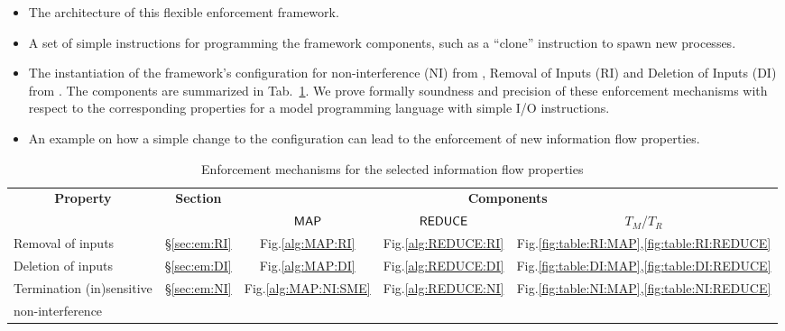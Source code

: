 \documentclass[10pt,a4paper,oneside]{article}
\def\TAV{\ensuremath{T_{M}}}
\def\TPV{\ensuremath{T_{R}}}
\def\sanserif#1{\ensuremath{\sf #1}}
\def\REDUCE{\ensuremath{\sanserif{REDUCE}}}
\def\MAP{\ensuremath{\sanserif{MAP}}}
\def\NCLONE{clone}
\begin{document}
\begin{itemize}
\item The architecture of this flexible enforcement framework.

\item A set of simple instructions for programming the framework components, such as a ``\NCLONE'' instruction to spawn new processes.

\item The instantiation of the framework's configuration for non-interference (NI) from \cite{Devr-Pies-10-IEEESP}, Removal of Inputs (RI) and Deletion of Inputs (DI) from \cite{MANT-00-CSF}. The components are summarized in Tab.~\ref{tab:component:ifp}. We prove formally soundness and precision of these enforcement mechanisms with respect to the corresponding properties for a model programming language with simple I/O instructions.
\item An example on how a simple change to the configuration can lead to the enforcement of new information flow properties.
\end{itemize}


\begin{table}
\centering
\caption{Enforcement mechanisms for the selected information flow properties}
\label{tab:component:ifp}
\begin{tabular}{|p{4.1cm}|c|c|c|c|}
\hline
\multicolumn{1}{|c|}{\multirow{2}{*}{\textbf{Property}}} & \multirow{2}{*}{\textbf{Section}} & \multicolumn{3}{c|}{\textbf{Components}}\\
\cline{3-5}
 & & \MAP& \REDUCE& \TAV/\TPV \\
\hline
\hline
Removal of inputs \cite{MANT-00-CSF} & \S\ref{sec:em:RI} & Fig.\ref{alg:MAP:RI} & Fig.\ref{alg:REDUCE:RI} & Fig.\ref{fig:table:RI:MAP},\ref{fig:table:RI:REDUCE} \\
\hline
Deletion of inputs \cite{MANT-00-CSF}  & \S\ref{sec:em:DI} & Fig.\ref{alg:MAP:DI} & Fig.\ref{alg:REDUCE:DI} & Fig.\ref{fig:table:DI:MAP},\ref{fig:table:DI:REDUCE} \\
\hline
Termination (in)sensitive  & \S\ref{sec:em:NI} & Fig.\ref{alg:MAP:NI:SME} & Fig.\ref{alg:REDUCE:NI} & Fig.\ref{fig:table:NI:MAP},\ref{fig:table:NI:REDUCE} \\
non-interference \cite{Devr-Pies-10-IEEESP} & & & &\\
\hline
\end{tabular}
\end{table}
\end{document}
